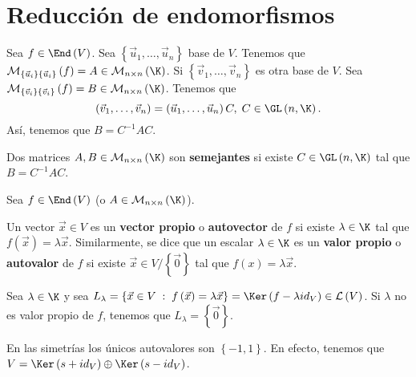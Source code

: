 \section{Reducción de endomorfismos}
Sea $\displaystyle f\in\End\left(V\right) $. Sea $\displaystyle \left\{ \vec{u}_{1}, \ldots, \vec{u}_{n}\right\}  $ base de $\displaystyle V $. Tenemos que $\displaystyle \mathcal{M}_{ \left\{ \vec{u}_{i}\right\} \left\{ \vec{u}_{i}\right\} }\left(f\right) = A \in \mathcal{M}_{n \times n}\left(\K\right) $. Si $\displaystyle \left\{ \vec{v}_{1}, \ldots, \vec{v}_{n}\right\}  $ es otra base de $\displaystyle V $. Sea $\displaystyle \mathcal{M}_{ \left\{ \vec{v}_{i}\right\} \left\{ \vec{v}_{i}\right\} }\left(f\right) = B \in \mathcal{M}_{n \times n}\left(\K\right) $. 
Tenemos que
\[ \left(\vec{v}_{1}, \ldots, \vec{v}_{n}\right) = \left(\vec{u}_{1}, \ldots, \vec{u}_{n}\right) C, \; C \in \GL\left(n,\K\right) .\]
Así, tenemos que $\displaystyle B = C^{-1} A C $.
\begin{fdefinition}[]
	\normalfont Dos matrices $\displaystyle A, B \in \mathcal{M}_{n \times n}\left(\K\right) $ son \textbf{semejantes} si existe $\displaystyle C \in \GL\left(n, \K\right) $ tal que $\displaystyle B = C^{-1}AC $.
\end{fdefinition}
Sea $\displaystyle f \in \End\left(V\right) $ (o $\displaystyle A \in \mathcal{M}_{n \times n}\left(\K\right) $).
\begin{fdefinition}[]
	\normalfont Un vector $\displaystyle \vec{x} \in V $ es un \textbf{vector propio} o \textbf{autovector} de $\displaystyle f $ si existe $\displaystyle \lambda \in \K $ tal que $\displaystyle f\left(\vec{x}\right) = \lambda \vec{x} $. Similarmente, se dice que un escalar $\displaystyle \lambda \in \K $ es un \textbf{valor propio} o \textbf{autovalor} de $\displaystyle f $ si existe $\displaystyle \vec{x} \in V/ \left\{ \vec{0}\right\}  $ tal que $\displaystyle f\left(x\right) = \lambda \vec{x} $.
\end{fdefinition}
Sea $\displaystyle \lambda \in \K $ y sea $\displaystyle L_{\lambda } = \left\{ \vec{x} \in V \; : \; f\left(\vec{x}\right) = \lambda\vec{x}\right\} = \Ker\left(f - \lambda id _{V}\right) \in \mathcal{L}\left(V\right)$. Si $\displaystyle \lambda  $ no es valor propio de $\displaystyle f $, tenemos que $\displaystyle L_{\lambda } = \left\{ \vec{0}\right\}  $.
\begin{observation}
	\normalfont En las simetrías los únicos autovalores son $\displaystyle \left\{ -1, 1\right\}  $. En efecto, tenemos que $\displaystyle V = \Ker\left(s + id _{V}\right) \oplus \Ker\left(s - id _{V}\right) $.
\end{observation}
